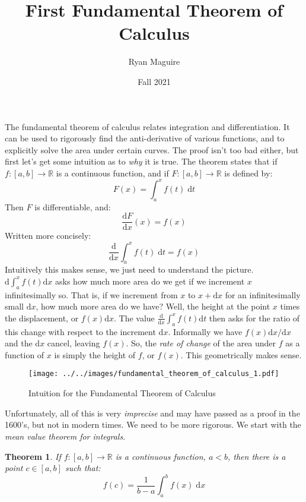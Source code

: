 \documentclass{article}
\title{First Fundamental Theorem of Calculus}
\author{Ryan Maguire}
\date{Fall 2021}
\theoremstyle{normal}
\theoremstyle{plain}
\newtheorem{theorem}{Theorem}
\begin{document}
    \maketitle
    The fundamental theorem of calculus relates integration and differentiation.
    It can be used to rigorously find the anti-derivative of various functions,
    and to explicitly solve the area under certain curves. The proof isn't too
    bad either, but first let's get some intuition as to \textit{why} it is
    true. The theorem states that if $f:[a,b]\rightarrow\mathbb{R}$ is a
    continuous function, and if $F:[a,b]\rightarrow\mathbb{R}$ is defined by:
    \begin{equation}
        F(x)=\int_{a}^{x}f(t)\;\textrm{d}t
    \end{equation}
    Then $F$ is differentiable, and:
    \begin{equation}
        \frac{\textrm{d}F}{\textrm{d}x}(x)=f(x)
    \end{equation}
    Written more concisely:
    \begin{equation}
        \frac{\textrm{d}}{\textrm{d}x}\int_{a}^{x}f(t)\;\textrm{d}t=f(x)
    \end{equation}
    Intuitively this makes sense, we just need to understand the picture.
    $\textrm{d}\int_{a}^{x}f(t)\textrm{d}x$ asks how much more
    area do we get if we increment $x$ infinitesimally so. That is, if we
    increment from $x$ to $x+\textrm{d}x$ for an infinitesimally small
    $\textrm{d}x$, how much more area do we have? Well, the height at the point
    $x$ times the displacement, or $f(x)\textrm{d}x$. The value
    $\frac{\textrm{d}}{\textrm{d}x}\int_{a}^{x}f(t)\textrm{d}t$ then asks for
    the ratio of this change with respect to the increment $\textrm{d}x$.
    Informally we have $f(x)\textrm{d}x/\textrm{d}x$ and the $\textrm{d}x$
    cancel, leaving $f(x)$. So, the \textit{rate of change} of the area under
    $f$ as a function of $x$ is simply the height of $f$, or $f(x)$. This
    geometrically makes sense.
    \begin{figure}[H]
        \centering
        \texttt{[image: ../../images/fundamental\_theorem\_of\_calculus\_1.pdf]}
        \caption{Intuition for the Fundamental Theorem of Calculus}
    \end{figure}
    Unfortunately, all of this is very
    \textit{imprecise} and may have passed as a proof in the 1600's, but not
    in modern times. We need to be more rigorous. We start with the
    \textit{mean value theorem for integrals}.
    \begin{theorem}
        If $f:[a,b]\rightarrow\mathbb{R}$ is a continuous function, $a<b$,
        then there is a point $c\in[a,b]$ such that:
        \begin{equation}
            f(c)=\frac{1}{b-a}\int_{a}^{b}f(x)\;\textrm{d}x
        \end{equation}
    \end{theorem}
\end{document}
